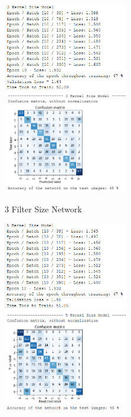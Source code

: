 \documentclass{article}
\begin{document}
    \begin{figure}[h!]
        \centering
        \begin{subfigure}[t]{0.45\textwidth}
            \centering
            \includegraphics[width=0.6\textwidth]{3KS_train}
            \includegraphics[width=0.6\textwidth]{3KS_cm}
            \caption{3 Filter Size Network}
        \end{subfigure}
        \begin{subfigure}[t]{0.45\textwidth}
            \centering
            \includegraphics[width=0.6\textwidth]{5KS_train}
            \includegraphics[width=0.6\textwidth]{5KS_cm}

\end{subfigure}
\end{figure}
\end{document}
